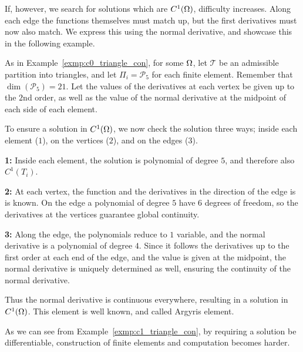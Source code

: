 If, however, we search for solutions which 
are $C^1(\Omega)$, difficulty increases. Along each edge the functions 
themselves must match up, but the first derivatives must now also match. 
We express this using the normal derivative, and showcase this in the 
following example. 
\begin{exmp}{\quad\label{exmp:c1_triangle_con}}
   As in Example~\ref{exmp:c0_triangle_con}, 
    for some $\Omega$, let $\mathcal{T}$ be an admissible partition into 
    triangles, and let $\Pi_i = \mathcal{P}_5$ for each finite element.
    Remember that $\dim(\mathcal{P}_5) = 21$.
    Let the values of the derivatives at each vertex be given up 
    to the $2$nd order, as well as the value of the normal derivative at the 
    midpoint of each side of each element.
    
    To ensure a solution in $C^1(\Omega)$, 
    we now check the solution three ways; inside each element ($1$), 
    on the vertices ($2$), and on the edges ($3$).
    \iffalse
    we now check the solution three ways:
    \begin{enumerate}
        \item Inside each element
        \item On the vertices
        \item On the edges
    \end{enumerate} 
    \fi

    \textbf{1:} Inside each element, the solution is polynomial of degree $5$, 
    and therefore also $C^1(T_i)$.

    \textbf{2:} At each vertex, the function and the derivatives in the direction of the edge is 
    is known. On the edge a polynomial of degree $5$ have 6 degrees of freedom, 
    so the derivatives at the vertices guarantee global continuity.

    \textbf{3:} Along the edge, the polynomials reduce to $1$ variable, and the 
    normal derivative is a polynomial of degree $4$. Since it follows 
    the derivatives up to the first order at each end of the edge, and 
    the value is given at the midpoint, the normal derivative is uniquely 
    determined as well, ensuring the continuity of the normal derivative.

    Thus the normal derivative is continuous everywhere, resulting in a 
    solution in $C^1(\Omega)$. This element is well known, and called 
    Argyris element.
\end{exmp}
As we can see from Example~\ref{exmp:c1_triangle_con}, by requiring a 
solution be differentiable, construction of finite elements and computation 
becomes harder. 

